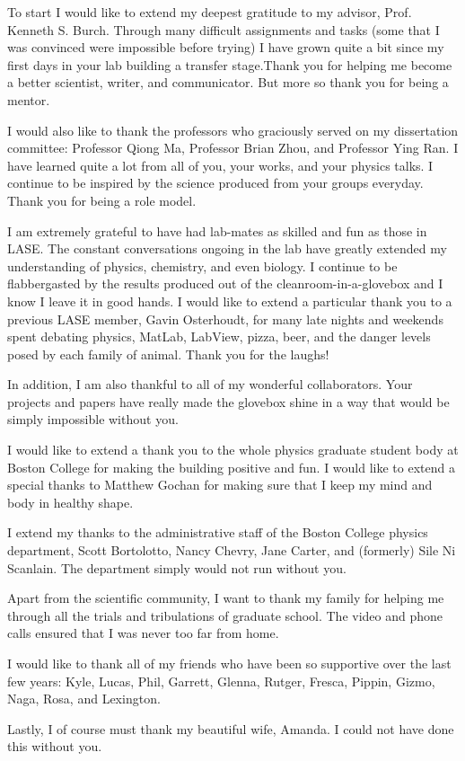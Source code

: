 To start I would like to extend my deepest gratitude to my advisor, Prof. Kenneth S. Burch. Through many difficult assignments and tasks (some that I was convinced were impossible before trying) I have grown quite a bit since my first days in your lab building a transfer stage.Thank you for helping me become a better scientist, writer, and communicator. But more so thank you for being a mentor. \par
I would also like to thank the professors who graciously served on my dissertation committee: Professor Qiong Ma, Professor Brian Zhou, and Professor Ying Ran. I have learned quite a lot from all of you, your works, and your physics talks. I continue to be inspired by the science produced from your groups everyday. Thank you for being a role model.\par
I am extremely grateful to have had lab-mates as skilled and fun as those in LASE. The constant conversations ongoing in the lab have greatly extended my understanding of physics, chemistry, and even biology. I continue to be flabbergasted by the results produced out of the cleanroom-in-a-glovebox and I know I leave it in good hands. I would like to extend a particular thank you to a previous LASE member, Gavin Osterhoudt, for many late nights and weekends spent debating physics, MatLab, LabView, pizza, beer, and the danger levels posed by each family of animal. Thank you for the laughs!\par
In addition, I am also thankful to all of my wonderful collaborators. Your projects and papers have really made the glovebox shine in a way that would be simply impossible without you. \par
I would like to extend a thank you to the whole physics graduate student body at Boston College for making the building positive and fun. I would like to extend a special thanks to Matthew Gochan for making sure that I keep my mind and body in healthy shape. \par
I extend my thanks to the administrative staff of the Boston College physics department, Scott Bortolotto, Nancy Chevry, Jane Carter, and (formerly) Sile Ni Scanlain. The department simply would not run without you.\par
Apart from the scientific community, I want to thank my family for helping me through all the trials and tribulations of graduate school. The video and phone calls ensured that I was never too far from home.\par
I would like to thank all of my friends who have been so supportive over the last few years: Kyle, Lucas, Phil, Garrett, Glenna, Rutger, Fresca, Pippin, Gizmo, Naga, Rosa, and Lexington.\par
Lastly, I of course must thank my beautiful wife, Amanda. I could not have done this without you. 